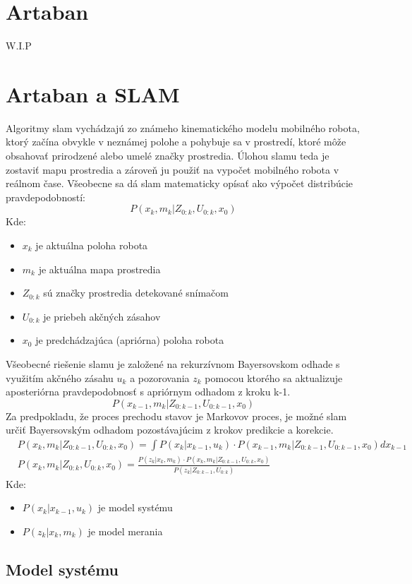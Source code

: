 \section{Artaban}
\begin{center}
    W.I.P
\end{center}

\section{Artaban a SLAM}
Algoritmy \acrshort{slam} vychádzajú zo známeho kinematického modelu mobilného robota, ktorý začína obvykle v neznámej polohe a pohybuje sa v prostredí, ktoré môže obsahovať prirodzené alebo umelé značky prostredia. Úlohou \acrshort{slam}u teda je zostaviť mapu prostredia a zároveň ju použiť na vypočet mobilného robota v reálnom čase.\cite{fs1}\newline
Všeobecne sa dá \acrshort{slam} matematicky opísať ako výpočet distribúcie pravdepodobností:
\begin{equation}
    P(x_k,m_k|Z_{0:k},U_{0:k},x_0)
\end{equation}
Kde:
\begin{itemize}
    \item $x_k$ je aktuálna poloha robota
    \item $m_k$ je aktuálna mapa prostredia
    \item $Z_{0:k}$ sú značky prostredia detekované snímačom
    \item $U_{0:k}$ je priebeh akčných zásahov
    \item $x_0$ je predchádzajúca (apriórna) poloha robota
\end{itemize}
Všeobecné riešenie \acrshort{slam}u je založené na rekurzívnom Bayersovskom odhade s využitím akčného zásahu $u_k$ a pozorovania $z_k$ pomocou ktorého sa aktualizuje aposteriórna pravdepodobnosť s apriórnym odhadom z kroku k-1.
\begin{equation}
    P(x_{k-1},m_k|Z_{0:k-1},U_{0:k-1},x_0)
\end{equation}
Za predpokladu, že proces prechodu stavov je Markovov proces, je možné \acrshort{slam} určiť Bayersovským odhadom pozostávajúcim z krokov predikcie a korekcie.\cite{fs2}
\begin{equation}
    \begin{split}
        & P(x_k,m_k|Z_{0:k-1},U_{0:k},x_0)=\int P(x_k|x_{k-1},u_k) \cdot P(x_{k-1},m_k|Z_{0:k-1},U_{0:k-1},x_0)dx_{k-1}\\
        & P(x_k,m_k|Z_{0:k},U_{0:k},x_0)=\frac{P(z_k|x_k,m_k)\cdot P(x_k,m_k|Z_{0:k-1},U_{0:k},x_0)}{P(z_k|Z_{0:k-1},U_{0:k})}
    \end{split}
\end{equation}
Kde:
\begin{itemize}
    \item $P(x_k|x_{k-1},u_k)$ je model systému
    \item $P(z_k|x_k,m_k)$ je model merania
\end{itemize}\newpage

\subsection{Model systému}
